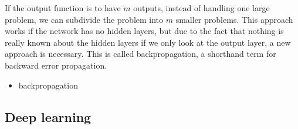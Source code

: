 If the output function is to have $m$ outputs, instead of handling one
large problem, we can subdivide the problem into $m$ smaller
problems. This approach works if the network has no hidden layers, but
due to the fact that nothing is really known about the hidden layers
if we only look at the output layer, a new approach is necessary. This
is called backpropagation, a shorthand term for backward error
propagation.
\begin{itemize}
\item backpropagation
\end{itemize}

\subsection{Deep learning}
\label{sec:neuralnetworks}





